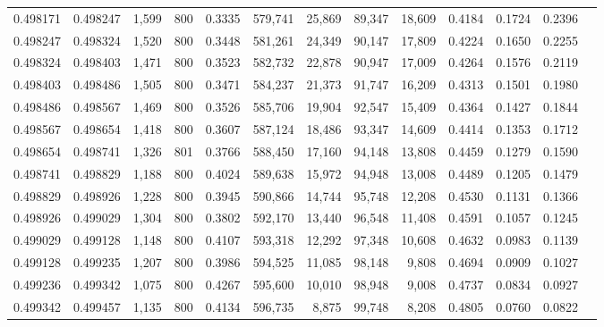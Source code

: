 \begin{tabular}{rrrrrrrrrrrrr}
0.498171 & 0.498247 &  1,599 & 800 &                                     0.3335 & 579,741 &  25,869 &  89,347 &  18,609 & 0.4184 & 0.1724 & 0.2396 \\
0.498247 & 0.498324 &  1,520 & 800 &                                     0.3448 & 581,261 &  24,349 &  90,147 &  17,809 & 0.4224 & 0.1650 & 0.2255 \\
0.498324 & 0.498403 &  1,471 & 800 &                                     0.3523 & 582,732 &  22,878 &  90,947 &  17,009 & 0.4264 & 0.1576 & 0.2119 \\
0.498403 & 0.498486 &  1,505 & 800 &                                     0.3471 & 584,237 &  21,373 &  91,747 &  16,209 & 0.4313 & 0.1501 & 0.1980 \\
0.498486 & 0.498567 &  1,469 & 800 &                                     0.3526 & 585,706 &  19,904 &  92,547 &  15,409 & 0.4364 & 0.1427 & 0.1844 \\
0.498567 & 0.498654 &  1,418 & 800 &                                     0.3607 & 587,124 &  18,486 &  93,347 &  14,609 & 0.4414 & 0.1353 & 0.1712 \\
0.498654 & 0.498741 &  1,326 & 801 &                                     0.3766 & 588,450 &  17,160 &  94,148 &  13,808 & 0.4459 & 0.1279 & 0.1590 \\
0.498741 & 0.498829 &  1,188 & 800 &                                     0.4024 & 589,638 &  15,972 &  94,948 &  13,008 & 0.4489 & 0.1205 & 0.1479 \\
0.498829 & 0.498926 &  1,228 & 800 &                                     0.3945 & 590,866 &  14,744 &  95,748 &  12,208 & 0.4530 & 0.1131 & 0.1366 \\
0.498926 & 0.499029 &  1,304 & 800 &                                     0.3802 & 592,170 &  13,440 &  96,548 &  11,408 & 0.4591 & 0.1057 & 0.1245 \\
0.499029 & 0.499128 &  1,148 & 800 &                                     0.4107 & 593,318 &  12,292 &  97,348 &  10,608 & 0.4632 & 0.0983 & 0.1139 \\
0.499128 & 0.499235 &  1,207 & 800 &                                     0.3986 & 594,525 &  11,085 &  98,148 &   9,808 & 0.4694 & 0.0909 & 0.1027 \\
0.499236 & 0.499342 &  1,075 & 800 &                                     0.4267 & 595,600 &  10,010 &  98,948 &   9,008 & 0.4737 & 0.0834 & 0.0927 \\
0.499342 & 0.499457 &  1,135 & 800 &                                     0.4134 & 596,735 &   8,875 &  99,748 &   8,208 & 0.4805 & 0.0760 & 0.0822 \\

\end{tabular}
